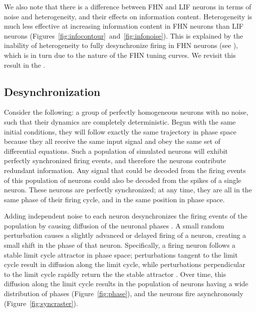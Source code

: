 \documentclass[12pt]{article}
\begin{document}
We also note that there is a difference between FHN and LIF neurons in terms of noise and heterogeneity, and their effects on information content. Heterogeneity is much less effective at increasing information content in FHN neurons than LIF neurons (Figures~\ref{fig:infocontour}~and~\ref{fig:infonoise}). This is explained by the inability of heterogeneity to fully desynchronize firing in FHN neurons (see \textsc{}), which is in turn due to the nature of the FHN tuning curves. We revisit this result in the \textsc{}.


\subsection{Desynchronization}
\label{scn:desync}

Consider the following: a group of perfectly homogeneous neurons with no noise, such that their dynamics are completely deterministic. Begun with the same initial conditions, they will follow exactly the same trajectory in phase space because they all receive the same input signal and obey the same set of differential equations. Such a population of simulated neurons will exhibit perfectly synchronized firing events, and therefore the neurons contribute redundant information. Any signal that could be decoded from the firing events of this population of neurons could also be decoded from the spikes of a single neuron. These neurons are perfectly synchronized; at any time, they are all in the same phase of their firing cycle, and in the same position in phase space.

Adding independent noise to each neuron desynchronizes the firing events of the population by causing diffusion of the neuronal phases \citep{Stocks2001a}. A small random perturbation causes a slightly advanced or delayed firing of a neuron, creating a small shift in the phase of that neuron. Specifically, a firing neuron follows a stable limit cycle attractor in phase space; perturbations tangent to the limit cycle result in diffusion along the limit cycle, while perturbations perpendicular to the limit cycle rapidly return the the stable attractor \citep{Tomita1974}. Over time, this diffusion along the limit cycle results in the population of neurons having a wide distribution of phases (Figure~\ref{fig:phase}), and the neurons fire asynchronously (Figure~\ref{fig:syncraster}).
\end{document}
